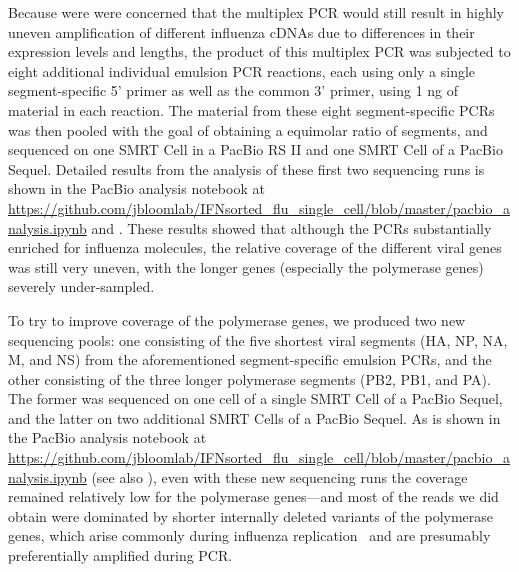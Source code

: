 \documentclass[9pt,lineno]{template}
\begin{document}
Because were were concerned that the multiplex PCR would still result in highly uneven amplification of different influenza cDNAs due to differences in their expression levels and lengths, the product of this multiplex PCR was subjected to eight additional individual emulsion PCR reactions, each using only a single segment-specific 5' primer as well as the common 3' primer, using 1 ng of material in each reaction.
The material from these eight segment-specific PCRs was then pooled with the goal of obtaining a equimolar ratio of segments, and sequenced on one SMRT Cell in a PacBio RS II and one SMRT Cell of a PacBio Sequel. 
Detailed results from the analysis of these first two sequencing runs is shown in the PacBio analysis notebook at \url{https://github.com/jbloomlab/IFNsorted_flu_single_cell/blob/master/pacbio_analysis.ipynb} and .
These results showed that although the PCRs substantially enriched for influenza molecules, the relative coverage of the different viral genes was still very uneven, with the longer genes (especially the polymerase genes) severely under-sampled.

To try to improve coverage of the polymerase genes, we produced two new sequencing pools: one consisting of the five shortest viral segments (HA, NP, NA, M, and NS) from the aforementioned segment-specific emulsion PCRs, and the other consisting of the three longer polymerase segments (PB2, PB1, and PA).
The former was sequenced on one cell of a single SMRT Cell of a PacBio Sequel, and the latter on two additional SMRT Cells of a PacBio Sequel. 
As is shown in the PacBio analysis notebook at \url{https://github.com/jbloomlab/IFNsorted_flu_single_cell/blob/master/pacbio_analysis.ipynb} (see also ), even with these new sequencing runs the coverage remained relatively low for the polymerase genes---and most of the reads we did obtain were dominated by shorter internally deleted variants of the polymerase genes, which arise commonly during influenza replication~\citep{xue2016propagation} and are presumably preferentially amplified during PCR.
\end{document}
